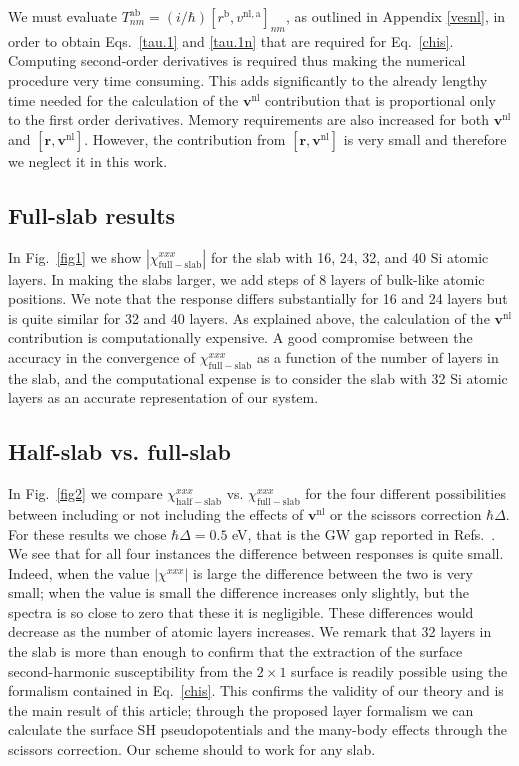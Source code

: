 \documentclass[floatfix,prb,aps,superscriptaddress,showpacs,letterpaper]{revtex4}
\begin{document}
We must evaluate 
$T^{\mathrm{a}\mathrm{b}}_{nm}=(i/\hbar)[r^\mathrm{b},v^{\mathrm{nl},\mathrm{a}}]_{nm}$,
as outlined in Appendix \ref{vesnl},
in order to obtain 
Eqs.~\eqref{tau.1} and \eqref{tau.1n} that are required for 
Eq.~\eqref{chis}.
Computing second-order 
derivatives is required thus making the numerical procedure very 
time consuming. This adds significantly to the already lengthy time needed 
for the calculation of the $\mathbf{v}^\mathrm{nl}$ contribution that is
proportional only to 
the first order derivatives. 
Memory requirements are also increased for both $\mathbf{v}^\mathrm{nl}$ and 
$[\mathbf{r},\mathbf{v}^\mathrm{nl}]$. However, the contribution from $[\mathbf{r},\mathbf{v}^\mathrm{nl}]$ 
is very small\cite{valerie} and therefore we neglect it in this work.

\subsection{Full-slab results}\label{fsresults}

In Fig.~\ref{fig1} we show $|\chi_{\mathrm{full-slab}}^{xxx}|$
for the slab with
16, 24, 32, and 40 Si atomic layers. 
In making the slabs larger, we add steps of 8 layers of bulk-like atomic positions. 
We note that the response differs substantially 
for 16 and 24 layers but is quite similar for 32 and 40 layers.
As explained above,
the calculation of the $\mathbf{v}^\mathrm{nl}$ contribution is 
computationally expensive.
A good compromise between the accuracy in the convergence of
$\chi^{xxx}_{\mathrm{full-slab}}$ as a function of the number
of layers in the slab, and the computational 
expense is to consider
the slab with 32 Si atomic layers as 
an accurate representation of our 
system.

\subsection{Half-slab vs. full-slab}

In Fig.~\ref{fig2}
we compare 
$\chi^{xxx}_{\mathrm{half-slab}}$  
vs. 
$\chi^{xxx}_{\mathrm{full-slab}}$ 
for the four different possibilities 
between including or not including the
effects of $\mathbf{v}^\mathrm{nl}$ or the scissors correction
$\hbar\Delta$.   
For these results we chose
$\hbar\Delta=0.5$ eV, that is the GW gap reported in
Refs.~. 
We see that for all four instances the 
difference between responses is quite small.
Indeed, when the value $|\chi^{xxx}|$ 
is large the difference between the two is very small; 
when the value is small the difference increases only slightly, 
but the spectra is so close to zero that these it is negligible. 
These differences would decrease as the number of atomic layers 
increases. We remark that 32 layers in the slab is more than enough 
to confirm that the extraction of the surface second-harmonic 
susceptibility from the $2\times 1$ surface is readily possible 
using the formalism contained in Eq.~\eqref{chis}.
This confirms the validity of our theory and is the main result of
this article; through the proposed layer formalism we can calculate the surface SH
pseudopotentials
and the many-body effects through the scissors correction.
Our scheme should to work for any slab.  
\end{document}
